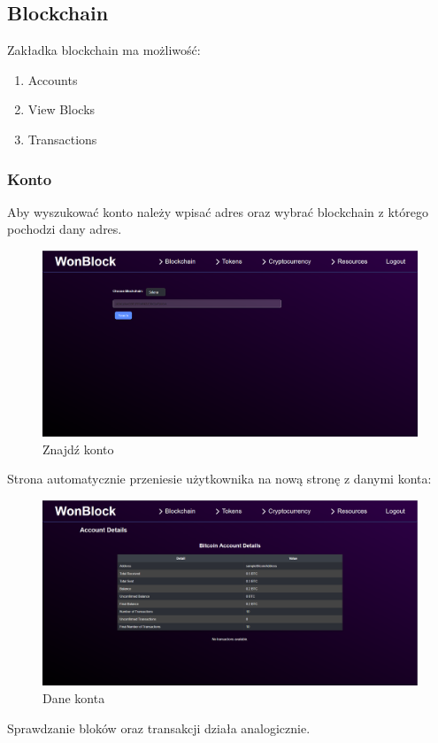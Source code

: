 \subsection{Blockchain}
Zakładka blockchain ma możliwość:
\begin{enumerate}
    \item Accounts
    \item View Blocks
    \item Transactions
\end{enumerate}
\subsubsection{Konto}
Aby wyszukować konto należy wpisać adres oraz wybrać blockchain z którego pochodzi dany adres.
\begin{figure}[htb]
    \centering
    \includegraphics[width=0.8\linewidth]{./instrukcja/Check_account.png}
    \caption{Znajdź konto}
    \label{fig:Znajdź konto}
\end{figure}

Strona automatycznie przeniesie użytkownika na nową stronę z danymi konta:
\begin{figure}[htb]
    \centering
    \includegraphics[width=0.8\linewidth]{./instrukcja/Account_details.png}
    \caption{Dane konta}
    \label{fig:Dane konta}
\end{figure}

Sprawdzanie bloków oraz transakcji działa analogicznie.

